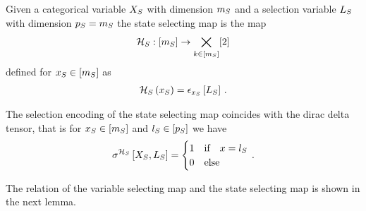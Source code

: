 \begin{definition}
    \label{def:stateSelector}
    Given a categorical variable $X_{S}$ with dimension $m_{S}$ and a selection variable $L_{S}$ with dimension $p_{S}=m_{S}$ the state selecting map is the map
    \begin{align*}
        \mathcal{H}_{S} : [m_{S}] \rightarrow \bigtimes_{k\in[m_{S}]} [2]
    \end{align*}
    defined for $x_{S}\in[m_{S}]$ as
    \begin{align*}
        \mathcal{H}_{S}\left(x_{S}\right) = \epsilon_{x_{S}}\left[L_{S}\right] \, .
    \end{align*}
\end{definition}

The selection encoding of the state selecting map coincides with the dirac delta tensor, that is for $x_{S}\in[m_{S}]$ and $l_{S}\in[p_{S}]$ we have
\begin{align*}
    \sigma^{\mathcal{H}_{S}}\left[X_{S},L_{S}\right] =
    \begin{cases}
        1 & \text{if} \quad x = l_{S} \\
        0 & \text{else}
    \end{cases} \, .
\end{align*}

The relation of the variable selecting map and the state selecting map is shown in the next lemma.

